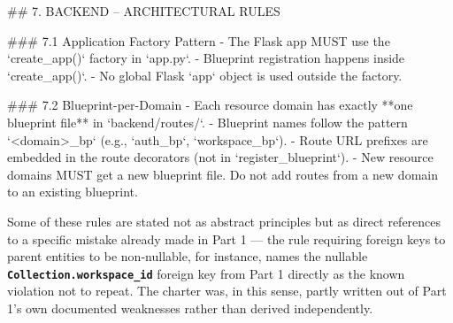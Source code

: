 \begin{listing}[H]
\begin{center}
\begin{promptbox}
## 7. BACKEND -- ARCHITECTURAL RULES

### 7.1 Application Factory Pattern
- The Flask app MUST use the `create_app()` factory in `app.py`.
- Blueprint registration happens inside `create_app()`.
- No global Flask `app` object is used outside the factory.

### 7.2 Blueprint-per-Domain
- Each resource domain has exactly **one blueprint file** in `backend/routes/`.
- Blueprint names follow the pattern `<domain>_bp` (e.g., `auth_bp`, `workspace_bp`).
- Route URL prefixes are embedded in the route decorators (not in `register_blueprint`).
- New resource domains MUST get a new blueprint file. Do not add routes from a new domain to an existing blueprint.
\end{promptbox}
\end{center}
\caption{Excerpt of \texttt{AGENTS.md} showing the Application Factory Pattern and Blueprint-per-Domain rules.}
\label{lst:agents-md-backend-rules}
\end{listing}

Some of these rules are stated not as abstract principles but as direct references to a specific mistake already made in Part 1 --- the rule requiring foreign keys to parent entities to be non-nullable, for instance, names the nullable \textbf{\texttt{Collection.workspace\_id}} foreign key from Part 1 directly as the known violation not to repeat. The charter was, in this sense, partly written out of Part 1's own documented weaknesses rather than derived independently.

